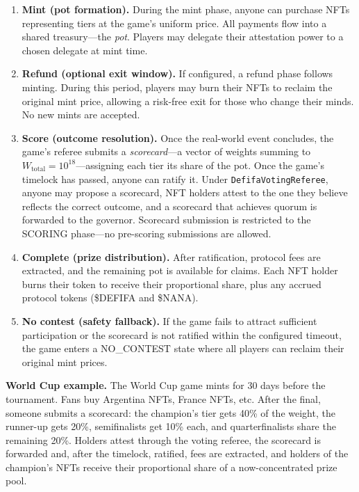 \documentclass[11pt,a4paper]{article}
\begin{document}
\begin{enumerate}[nosep]
    \item \textbf{Mint (pot formation).} During the mint phase, anyone can purchase NFTs representing tiers at the game's uniform price. All payments flow into a shared treasury---the \emph{pot}. Players may delegate their attestation power to a chosen delegate at mint time.

    \item \textbf{Refund (optional exit window).} If configured, a refund phase follows minting. During this period, players may burn their NFTs to reclaim the original mint price, allowing a risk-free exit for those who change their minds. No new mints are accepted.

    \item \textbf{Score (outcome resolution).} Once the real-world event concludes, the game's referee submits a \emph{scorecard}---a vector of weights summing to $W_{\text{total}} = 10^{18}$---assigning each tier its share of the pot. Once the game's timelock has passed, anyone can ratify it. Under \texttt{DefifaVotingReferee}, anyone may propose a scorecard, NFT holders attest to the one they believe reflects the correct outcome, and a scorecard that achieves quorum is forwarded to the governor. Scorecard submission is restricted to the SCORING phase---no pre-scoring submissions are allowed.

    \item \textbf{Complete (prize distribution).} After ratification, protocol fees are extracted, and the remaining pot is available for claims. Each NFT holder burns their token to receive their proportional share, plus any accrued protocol tokens (\$DEFIFA and \$NANA).

    \item \textbf{No contest (safety fallback).} If the game fails to attract sufficient participation or the scorecard is not ratified within the configured timeout, the game enters a NO\_CONTEST state where all players can reclaim their original mint prices.
\end{enumerate}

\textbf{World Cup example.} The World Cup game mints for 30 days before the tournament. Fans buy Argentina NFTs, France NFTs, etc. After the final, someone submits a scorecard: the champion's tier gets 40\% of the weight, the runner-up gets 20\%, semifinalists get 10\% each, and quarterfinalists share the remaining 20\%. Holders attest through the voting referee, the scorecard is forwarded and, after the timelock, ratified, fees are extracted, and holders of the champion's NFTs receive their proportional share of a now-concentrated prize pool.
\end{document}
